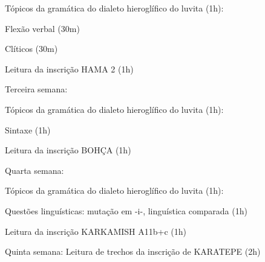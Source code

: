 \documentclass[article,12pt]{memoir}
\begin{document}
\begin{compactitem}
	\begin{compactitem}
		\item Tópicos da gramática do dialeto hieroglífico do luvita (1h):
		\begin{compactitem}
			\item Flexão verbal (30m)
			\item Clíticos (30m)
		\end{compactitem}
		\item Leitura da inscrição HAMA 2 (1h)
	\end{compactitem}
	\item Terceira semana:
	\begin{compactitem}
		\item Tópicos da gramática do dialeto hieroglífico do luvita (1h):
		\begin{compactitem}
			\item Sintaxe (1h)
		\end{compactitem}
		\item Leitura da inscrição BOHÇA (1h)
	\end{compactitem}
	\item Quarta semana:
	\begin{compactitem}
		\item Tópicos da gramática do dialeto hieroglífico do luvita (1h):
		\begin{compactitem}
			\item Questões linguísticas: mutação em -i-, linguística comparada (1h)
		\end{compactitem}
		\item Leitura da inscrição KARKAMISH A11b+c (1h)
	\end{compactitem}
	\item Quinta semana: Leitura de trechos da inscrição de KARATEPE (2h)
\end{compactitem}
\end{document}
